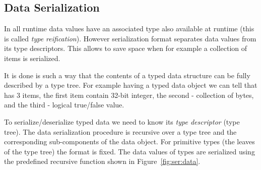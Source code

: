 \subsection{Data Serialization}
\label{sec:ser:data}

In \langname all runtime data values have an associated type also available
at runtime (this is called \emph{type reification}\cite{Reification}).
However serialization format separates data values from its type descriptors. 
This allows to save space when for example a collection of items is serialized.

It is done is such a way that the contents of a typed data structure can be fully
described by a type tree. For example having a typed data object  we can tell that  has 3 items, the first item contain
32-bit integer, the second - collection of bytes, and the third - logical true/false
value.

To serialize/deserialize typed data we need to know its \emph{type descriptor} (type
tree). The data serialization procedure is recursive over a type tree and the corresponding
sub-components of the data object. For primitive types (the leaves of the type tree) the
format is fixed. The data values of \langname types are serialized using the predefined
recursive function shown in Figure~\ref{fig:ser:data}.

